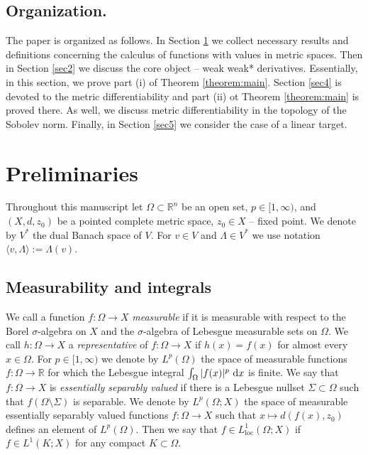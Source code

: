 \documentclass[reqno]{amsart}
\begin{document}
\subsection{Organization.}
The paper is organized as follows.
In Section \ref{sec1} we collect necessary results
and definitions concerning the calculus of functions with values in metric spaces.
Then in Section \ref{sec2} we discuss the core object -- weak weak* derivatives. Essentially, in this section, we prove part (i) of  Theorem \ref{theorem:main}.
Section \ref{sec4} is devoted to the metric differentiability and part (ii) ot Theorem \ref{theorem:main} is proved there.
As well, we discuss metric differentiability in the topology of the Sobolev norm.
Finally, in Section \ref{sec5} we consider the case of a linear target.



\section{Preliminaries}\label{sec1}
Throughout this manuscript let $\Omega \subset\mathbb{R}^n$ be an open set, 
$p\in [1,\infty)$, and $(X, d, z_0)$ be a pointed complete metric space, $z_0\in X$ -- fixed point.
We denote by $V^*$ the dual Banach space of $V$. 
For  $v\in V$ and $\Lambda\in V^*$ we use notation $\langle v , \Lambda \rangle :=\Lambda(v)$.


\subsection{Measurability and integrals}
\label{subsec:meas-int}
We call a function $f\colon \Omega \to X$ \emph{measurable} if it is measurable with respect to the Borel $\sigma$-algebra on $X$ and the $\sigma$-algebra of Lebesgue measurable sets on $\Omega$. 
We call $h\colon \Omega \to X$ a \emph{representative} of $f\colon \Omega \to X$  if $h(x)=f(x)$ for almost every $x\in \Omega$.
For $p\in [1,\infty)$ we denote by $L^p(\Omega)$ the space of measurable functions $f\colon \Omega \to \mathbb{R}$ for which the Lebesgue integral $\int_\Omega |f(x)|^p\ \textnormal{d}x$  is finite. 
We say that $f\colon \Omega \to X$ is  \emph{essentially separably valued} if there is a Lebesgue nullset $\Sigma\subset \Omega$ such that $f(\Omega \setminus \Sigma)$ is separable.
We denote by $L^p(\Omega; X)$ the space of measurable essentially separably valued functions 
$f\colon \Omega \to X$ such that $x\mapsto d(f(x), z_0)$  defines an element of $L^p(\Omega)$.
Then we say that $f\in L^1_{\operatorname{loc}}(\Omega; X)$ if $f\in L^1(K; X)$ for any compact $K\subset\Omega$.
\end{document}
